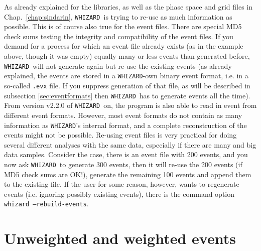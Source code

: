 \documentclass[12pt]{book}
\newcommand{\ttt}[1]{\texttt{#1}}
\newcommand{\whizard}{\ttt{WHIZARD}}
\begin{document}
As already explained for the libraries, as well as the phase space and
grid files in Chap.~\ref{chap:sindarin}, \whizard\ is trying to re-use
as much information as possible. This is of course also true for the
event files. There are special MD5 check sums testing the integrity
and compatibility of the event files. If you demand for a process for
which an event file already exists (as in the example above, though it
was empty) equally many or less events than generated before,
\whizard\ will not generate again but re-use the existing events (as
already explained, the events are stored in a \whizard-own
binary event format, i.e. in a so-called \ttt{.evx} file. If you
suppress generation of that file, as will be described in subsection
\ref{sec:eventformats} then \whizard\ has to generate events all the
time). From version v2.2.0 of \whizard\ on, the program is also able
to read in event from different event formats. However, most event
formats do not contain as many information as \whizard's internal
format, and a complete reconstruction of the events might not be
possible. Re-using event files is very practical for doing several
different analyses with the same data, especially if there are many
and big data samples. Consider
the case, there is an event file with 200 events, and you now ask
\whizard\ to generate 300 events, then it will re-use the 200 events
(if MD5 check sums are OK!), generate the remaining 100 events and
append them to the existing file. If the user for some reason,
however, wants to regenerate events (i.e. ignoring possibly existing
events), there is the command option \ttt{whizard --rebuild-events}.


\section{Unweighted and weighted events}
\end{document}
